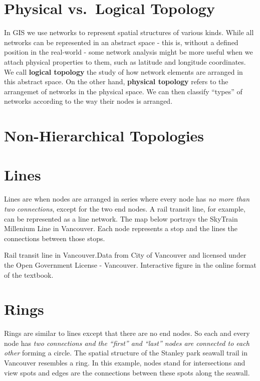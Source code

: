\documentclass[
]{book}
\begin{document}
\hypertarget{physical-vs.-logical-topology}{%
\section{Physical vs.~Logical Topology}\label{physical-vs.-logical-topology}}

In GIS we use networks to represent spatial structures of various kinds. While all networks can be represented in an abstract space - this is, without a defined position in the real-world - some network analysis might be more useful when we attach physical properties to them, such as latitude and longitude coordinates. We call \textbf{logical topology} the study of how network elements are arranged in this abstract space. On the other hand, \textbf{physical topology} refers to the arrangemet of networks in the physical space. We can then classify ``types'' of networks according to the way their nodes is arranged.

\hypertarget{non-hierarchical-topologies}{%
\section{Non-Hierarchical Topologies}\label{non-hierarchical-topologies}}

\hypertarget{lines}{%
\section{Lines}\label{lines}}

Lines are when nodes are arranged in series where every node has \emph{no more than two connections}, except for the two end nodes. A rail transit line, for example, can be represented as a line network. The map below portrays the SkyTrain Millenium Line in Vancouver. Each node represents a stop and the lines the connections between those stops.

\label{fig:unnamed-chunk-13}Rail transit line in Vancouver.Data from City of Vancouver and licensed under the Open Government License - Vancouver. Interactive figure in the online format of the textbook.

\hypertarget{rings}{%
\section{Rings}\label{rings}}

Rings are similar to lines except that there are no end nodes. So each and every node has \emph{two connections and the ``first'' and ``last'' nodes are connected to each other} forming a circle. The spatial structure of the Stanley park seawall trail in Vancouver resembles a ring. In this example, nodes stand for intersections and view spots and edges are the connections between these spots along the seawall.
\end{document}
